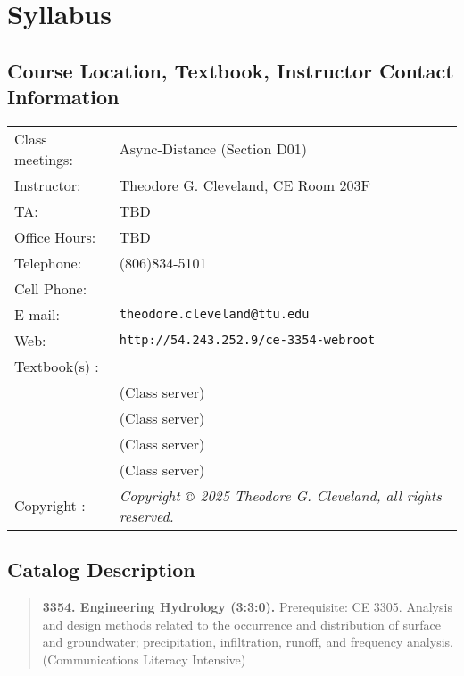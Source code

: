 \documentclass[12pt]{article}
\begin{document}
\section*{Syllabus}

\subsection*{{Course Location, Textbook, Instructor Contact Information}}
\begin{tabular}{p{1.5in}p{5.0in}}
Class meetings: & Async-Distance (Section D01) \\
Instructor: & Theodore G. Cleveland, CE Room 203F \\
TA: & TBD \\
Office Hours: & TBD \\%
Telephone: & (806)834-5101 \\
Cell Phone: &  \\
E-mail: & \texttt{theodore.cleveland@ttu.edu}\\
Web: & \texttt{http://54.243.252.9/ce-3354-webroot}\\
Textbook(s) : & \cite{Gupta2017} \\
~ & \cite{CMM1988} (Class server) \\
~ & \cite{Dooge1973} (Class server) \\
~ & \cite{McCuen2002} (Class server) \\
~ & \cite{Cleveland2024} (Class server)\\
Copyright : & \textsl{Copyright $\copyright$ 2025 Theodore G. Cleveland, all rights reserved.} \\
\end{tabular}
\subsection*{{Catalog Description}}
\begin{quote} \textbf{3354. Engineering Hydrology (3:3:0).}  Prerequisite: CE 3305. Analysis and design methods related to the occurrence and distribution of surface and groundwater; precipitation, infiltration, runoff, and frequency analysis. (Communications Literacy Intensive)
\end{quote}
\end{document}
